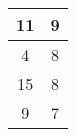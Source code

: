 \begin{table}[H]
\begin{tabular}{cc}
\multicolumn{1}{|c|}{11}                                                        & \multicolumn{1}{c|}{9}                                                             \\ \hline
\multicolumn{1}{|c|}{4}                                                        & \multicolumn{1}{c|}{8}                                                             \\ \hline
\multicolumn{1}{|c|}{15}                                                        & \multicolumn{1}{c|}{8}                                                             \\ \hline
\multicolumn{1}{|c|}{9}                                                        & \multicolumn{1}{c|}{7}                                                             \\ \hline
\end{tabular}\end{table}